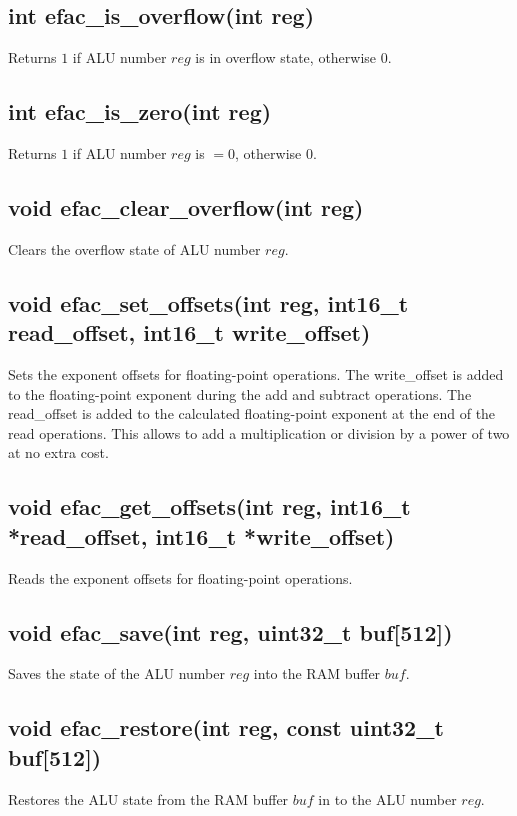 \subsection{int efac\_is\_overflow(int reg)}
Returns $1$ if ALU number $reg$ is in overflow state, otherwise $0$.
\subsection{int efac\_is\_zero(int reg)}
Returns $1$ if ALU number $reg$ is $= 0$, otherwise $0$.
\subsection{void efac\_clear\_overflow(int reg)}
Clears the overflow state of ALU number $reg$.
\subsection{void efac\_set\_offsets(int reg, int16\_t read\_offset, int16\_t write\_offset)}
Sets the exponent offsets for floating-point operations.
The write\_offset is added to the floating-point exponent during the add
and subtract operations.
The read\_offset is added to the calculated floating-point exponent at the
end of the read operations.
This allows to add a multiplication or division by a power of two at no extra
cost.
\subsection{void efac\_get\_offsets(int reg, int16\_t *read\_offset, int16\_t *write\_offset)}
Reads the exponent offsets for floating-point operations.
\subsection{void efac\_save(int reg, uint32\_t buf[512])}
Saves the state of the ALU number $reg$ into the RAM buffer $buf$.
\subsection{void efac\_restore(int reg, const uint32\_t buf[512])}
Restores the ALU state from the RAM buffer $buf$ in to the ALU number $reg$.
